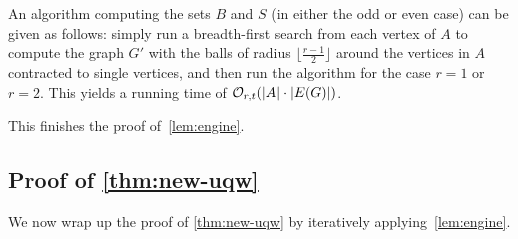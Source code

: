 \medskip
An algorithm computing the sets $B$ and $S$ (in either the odd or even case) can be given as follows:
simply run a breadth-first search from each vertex of $A$ to compute the graph $G'$ with the balls of radius  $\lfloor \frac{r-1}2 \rfloor$  around the vertices in $A$ contracted to single vertices, 
and then run the algorithm for the case $r=1$ or $r=2$.
This yields a running time of  $\mathcal{O}_{r,t}(|A|\cdot |E(G)|)$.
 \medskip
  
This finishes  the proof of~\cref{lem:engine}.

\subsection{Proof of \cref{thm:new-uqw}}
We now wrap up the proof of \cref{thm:new-uqw} by iteratively applying~\cref{lem:engine}.

